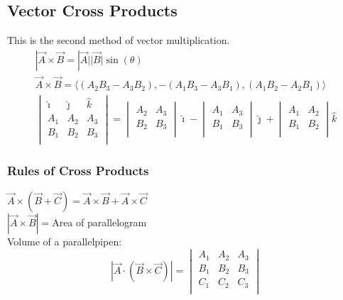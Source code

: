 \documentclass{article}
\begin{document}
    \subsection{Vector Cross Products}
    This is the second method of vector multiplication.\\
    \begin{equation}
    \begin{aligned}
    |\vec{A}\times\vec{B}=|\vec{A}||\vec{B}|\sin(\theta)\\
    \vec{A}\times\vec{B}=\langle (A_2B_3-A_3B_2),-(A_1B_3-A_3B_1),(A_1B_2-A_2B_1) \rangle\\
    \begin{vmatrix}
    \hat{\imath} & \hat{\jmath} & \hat{k}\\
    A_1 & A_2 & A_3\\
    B_1 & B_2 & B_3\\
    \end{vmatrix}
    = \begin{vmatrix}
    A_2 & A_3\\
    B_2 & B_3\\
    \end{vmatrix} \hat{\imath}-
    \begin{vmatrix}
    A_1 & A_3\\
    B_1 & B_3\\
    \end{vmatrix} \hat{\jmath}+
    \begin{vmatrix}
    A_1 & A_2\\
    B_1 & B_2\\
    \end{vmatrix} \hat{k}
    \end{aligned}
    \end{equation}

        \subsubsection{Rules of Cross Products}
        $\vec{A}\times(\vec{B}+\vec{C})=\vec{A}\times\vec{B}+\vec{A}\times\vec{C}$\\
        $|\vec{A}\times\vec{B}|=$Area of parallelogram\\
        Volume of a parallelpipen:
        \begin{equation}
        |\vec{A}\cdot(\vec{B}\times\vec{C})|=
        \begin{vmatrix}
        A_1 & A_2 & A_3\\
        B_1 & B_2 & B_3\\
        C_1 & C_2 & C_3\\
        \end{vmatrix}
        \end{equation}
\end{document}

